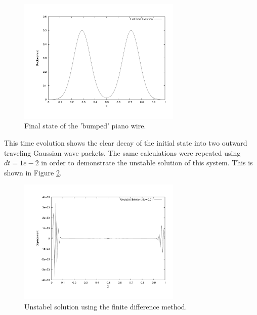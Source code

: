 \documentclass[12pt]{article}
\begin{document}
\begin{figure}[!h]
\centering
\includegraphics[width =110 mm, height = 60mm]{Ex_7_1_100.pdf}
\caption{Final state of the 'bumped' piano wire.}
\label{fig:7_1_100}
\end{figure}

This time evolution shows the clear decay of the initial state into two outward traveling Gaussian wave packets.  The same calculations were repeated using $dt=1e-2$ in order to demonstrate the unstable solution of this system.  This is shown in Figure \ref{fig:7_2}.
\begin{figure}[!h]
\centering
\includegraphics[width =110 mm, height = 60mm]{Ex_7_2.pdf}
\caption{Unstabel solution using the finite difference method.}
\label{fig:7_2}
\end{figure}
\end{document}
